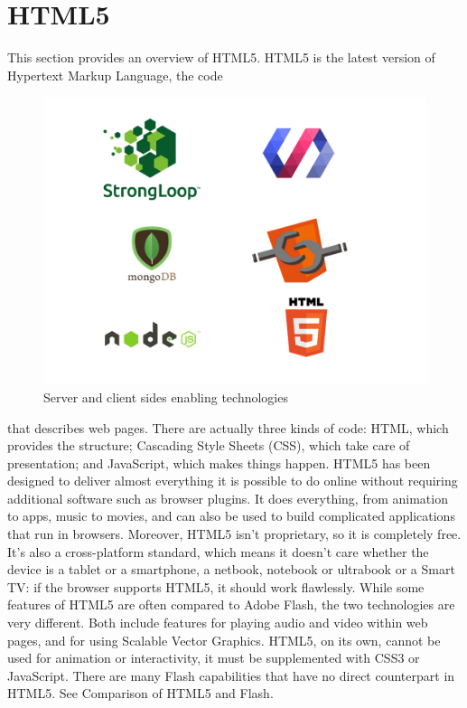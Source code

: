 \section{HTML5}
\label{sec:html5}
This section provides an overview of HTML5.
HTML5 is the latest version of Hypertext Markup Language, the code
\begin{figure}[htb]
 \centering
 \includegraphics[width=1.0\linewidth]{images/chapter2/tecnologie.jpeg}\hfill
 \caption[Server and client sides enabling  technologies]{Server and client sides enabling  technologies}
 \label{fig:fourV}
\end{figure}
that describes web pages. There are actually three kinds of code: HTML, which provides the structure; Cascading Style Sheets (CSS), which take care of presentation; and JavaScript, which makes things happen.
\newline
HTML5 has been designed to deliver almost everything it is possible to do online without requiring additional software such as browser plugins. It does everything, from animation to apps, music to movies, and can also be used to build complicated applications that run in browsers.
\newline
Moreover, HTML5 isn’t proprietary, so it is completely free. It’s also a cross-platform standard, which means it doesn’t care whether the device is a tablet or a smartphone, a netbook, notebook or ultrabook or a Smart TV: if the browser supports HTML5, it should work  flawlessly.
\newline
While some features of HTML5 are often compared to Adobe Flash, the two technologies are very different. Both include features for playing audio and video within web pages, and for using Scalable Vector Graphics. HTML5, on its own, cannot be used for animation or interactivity, it must be supplemented with CSS3 or JavaScript. There are many Flash capabilities  that have no direct counterpart in HTML5. See Comparison of HTML5 and Flash.
